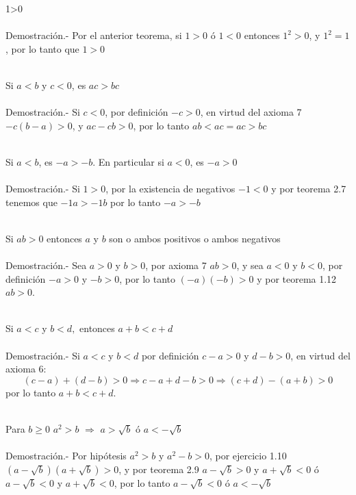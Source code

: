 \begin{teo}
1>0\\\\
Demostración.- \;
Por el anterior teorema, si $1>0$ ó $1<0$ entonces $1^2>0$, y $1^2=1$, por lo tanto que $1>0$\\\\
\end{teo}

\begin{teo}
Si $a<b$ y $c<0$, es $ac>bc$\\\\
Demostración.- \;
Si $c<0$, por definición $-c>0$, en virtud del axioma 7 $-c(b-a)>0$, y $ac-cb>0$, por lo tanto $ab<ac=ac>bc$\\\\
\end{teo}

\begin{teo}
Si $a<b$, es $-a>-b$. En particular si $a<0$, es $-a>0$\\\\
Demostración.- \;
Si $1>0$, por la existencia de negativos $-1<0$ y por teorema 2.7 tenemos que $-1a>-1b$ por lo tanto $-a>-b$ \\\\
\end{teo}

\begin{teo}
Si $ab>0$ entonces $a$ y $b$ son o ambos positivos o ambos negativos\\\\
Demostración.- \;
Sea $a>0$ y $b>0$, por axioma 7 \;  $ab>0$, y sea $a<0$ y $b<0$, por definición $-a>0$ y $-b>0$, por lo tanto $(-a)(-b)>0$ y por teorema 1.12 \; $ab>0$.\\\\
 
\end{teo}

\begin{teo}
Si $a<c$ y $b<d,$ entonces $a+b<c+d$\\\\
Demostración.- \;
Si $a<c$ \; y \; $b<d$ por definición $c-a>0$ \; y \; $d-b>0$, en virtud del axioma 6:
$$(c-a)+(d-b)>0 \Rightarrow c-a+d-b>0 \Rightarrow (c+d)-(a+b)>0$$ 
por lo tanto $a+b<c+d$.\\\\ 
\end{teo}

\begin{teo}
Para $b\geq 0$ $a^2>b$ $\Rightarrow$ $a>\sqrt{b}$ ó $a<-\sqrt{b}$\\\\
Demostración.- \;
Por hipótesis $a^2>b$ y $a^2-b>0$, por ejercicio 1.10 \; $(a-\sqrt{b})(a+\sqrt{b})>0$, y por teorema 2.9 \; $a-\sqrt{b}>0$ \; y \; $a+\sqrt{b}<0$ \; ó \; $a-\sqrt{b}<0$ \; y \; $a+\sqrt{b}<0$, por lo tanto $a-\sqrt{b}<0$ \; ó \; $a<-\sqrt{b}$\\\\
\end{teo}



